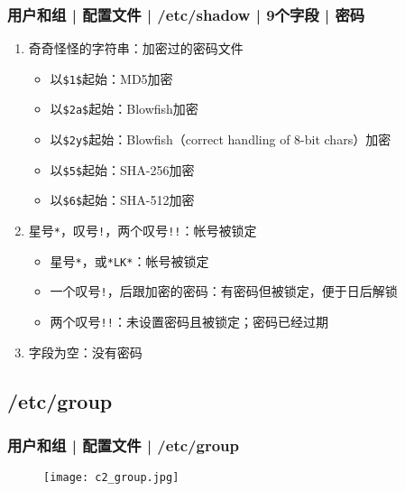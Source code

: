 \begin{frame}[fragile]
  \frametitle{用户和组 | 配置文件 | /etc/shadow | 9个字段 | 密码}
  \begin{enumerate}
    \item 奇奇怪怪的字符串：加密过的密码文件 
      \begin{itemize}
        \item 以\verb|$1$|起始：MD5加密
        \item 以\verb|$2a$|起始：Blowfish加密
        \item 以\verb|$2y$|起始：Blowfish（correct handling of 8-bit chars）加密
        \item 以\verb|$5$|起始：SHA-256加密
        \item 以\verb|$6$|起始：SHA-512加密
      \end{itemize}
    \item 星号\verb|*|，叹号\verb|!|，两个叹号\verb|!!|：\alert{帐号被锁定}
      \begin{itemize}
        \item 星号\verb|*|，或\verb|*LK*|：帐号被锁定
        \item 一个叹号\verb|!|，后跟加密的密码：有密码但被锁定，便于日后解锁
        \item 两个叹号\verb|!!|：未设置密码且被锁定；密码已经过期
      \end{itemize}
    \item 字段为空：没有密码
  \end{enumerate}
\end{frame}

\subsection{/etc/group}
\begin{frame}
  \frametitle{用户和组 | 配置文件 | /etc/group}
  \begin{figure}
    \centering
    \texttt{[image: c2\_group.jpg]}
  \end{figure}
\end{frame}

